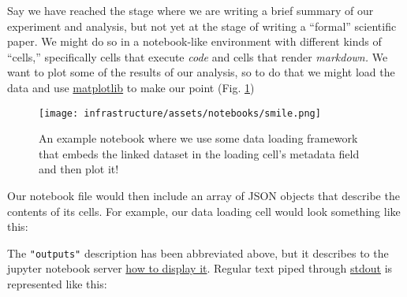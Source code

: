 Say we have reached the stage where we are writing a brief summary of
our experiment and analysis, but not yet at the stage of writing a
``formal'' scientific paper. We might do so in a notebook-like \citep{kluyverJupyterNotebooksPublishing2016}  environment with different
kinds of ``cells,'' specifically cells that execute \emph{code} and
cells that render \emph{markdown.} We want to plot some of the results
of our analysis, so to do that we might load the data and use
\href{https://matplotlib.org/}{matplotlib} \citep{hunterMatplotlib2DGraphics2007}  to make our point (Fig. \ref{fig:smilenotebook})

\begin{figure}[h]
\texttt{[image: infrastructure/assets/notebooks/smile.png]}
\label{fig:smilenotebook}
\caption{An example notebook where we use some data loading framework that embeds the linked dataset in the loading cell's metadata field and then plot it!}
\end{figure}

Our notebook file would then include an array of JSON objects that
describe the contents of its cells. For example, our data loading cell
would look something like this:

\begin{Shaded}
\begin{Highlighting}[]
\FunctionTok{\{}
   \FunctionTok{:} \FunctionTok{,}
   \FunctionTok{:} \FunctionTok{,}
   \FunctionTok{:} \FunctionTok{,}
   \FunctionTok{:} \FunctionTok{\{}
    \FunctionTok{:} 
   \FunctionTok{\},}
   \FunctionTok{:} \OtherTok{[}
   \OtherTok{]}\FunctionTok{,}
   \FunctionTok{:} \OtherTok{[}
   \OtherTok{]}
\FunctionTok{\}}
\end{Highlighting}
\end{Shaded}

The \texttt{"outputs"} description has been abbreviated above, but it
describes to the jupyter notebook server
\href{https://ipywidgets.readthedocs.io/en/latest/examples/Widget\%20Low\%20Level.html}{how
to display it}. Regular text piped through
\href{https://en.wikipedia.org/wiki/Standard_streams}{stdout} is
represented like this:

